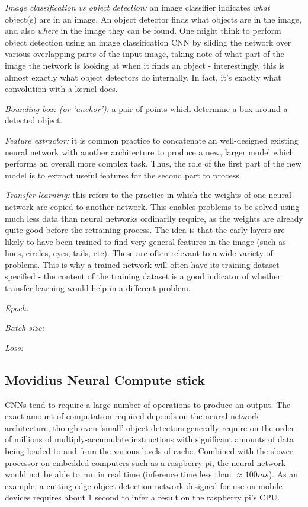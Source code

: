 \textit{Image classification vs object detection:} an image classifier indicates \emph{what} object(s) are in an image. An object detector finds what objects are in the image, and also \emph{where} in the image they can be found. One might think to perform object detection using an image classification CNN by sliding the network over various overlapping parts of the input image, taking note of what part of the image the network is looking at when it finds an object - interestingly, this is almost exactly what object detectors do internally. In fact, it's exactly what convolution with a kernel does.

\textit{Bounding box: (or 'anchor'):} a pair of points which determine a box around a detected object.

\textit{Feature extractor:} it is common practice to concatenate an well-designed existing neural network with another architecture to produce a new, larger model which performs an overall more complex task. Thus, the role of the first part of the new model is to extract useful features for the second part to process.

\textit{Transfer learning:} this refers to the practice in which the weights of one neural network are copied to another network. This enables problems to be solved using much less data than neural networks ordinarily require, as the weights are already quite good before the retraining process. The idea is that the early layers are likely to have been trained to find very general features in the image (such as lines, circles, eyes, tails, etc). These are often relevant to a wide variety of problems. This is why a trained network will often have its training dataset specified - the content of the training dataset is a good indicator of whether transfer learning would help in a different problem.

\textit{Epoch:}

\textit{Batch size:}

\textit{Loss:}

\subsection{Movidius Neural Compute stick}
CNNs tend to require a large number of operations to produce an output. The exact amount of computation required depends on the neural network architecture, though even 'small' object detectors generally require on the order of millions of multiply-accumulate instructions with significant amounts of data being loaded to and from the various levels of cache. Combined with the slower processor on embedded computers such as a raspberry pi, the neural network would not be able to run in real time (inference time less than $\approx 100ms$). As an example, a cutting edge object detection network designed for use on mobile devices requires about 1 second to infer a result on the raspberry pi's CPU.

